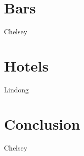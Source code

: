 \documentclass[11pt]{article}
\begin{document}
\section{Bars}

Chelsey

\section{Hotels}

Lindong


\section{Conclusion}


Chelsey
\end{document}

